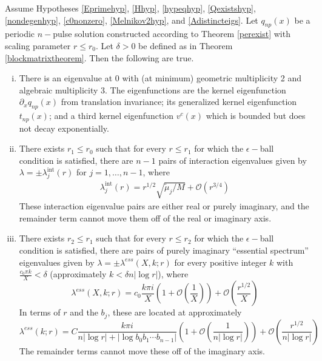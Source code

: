 \documentclass[thesis.tex]{subfiles}
\begin{document}

\begin{theorem}\label{locateeigtheorem}
Assume Hypotheses \ref{Eprimehyp}, \ref{Hhyp}, \ref{hypeqhyp}, \ref{Qexistshyp}, \ref{nondegenhyp}, \ref{c0nonzero}, \ref{Melnikov2hyp}, and \ref{Adistincteigs}. Let $q_{np}(x)$ be a periodic $n-$pulse solution constructed according to Theorem \ref{perexist} with scaling parameter $r \leq r_0$. Let $\delta > 0$ be defined as in Theorem \ref{blockmatrixtheorem}. Then the following are true.

\begin{enumerate}[(i)]

\item There is an eigenvalue at 0 with (at minimum) geometric multiplicity 2 and algebraic multiplicity 3. The eigenfunctions are the kernel eigenfunction $\partial_x q_{np}(x)$ from translation invariance; its generalized kernel eigenfunction $t_{np}(x)$; and a third kernel eigenfunction $v^c(x)$ which is bounded but does not decay exponentially.

\item There exists $r_1 \leq r_0$ such that for every $r \leq r_1$ for which the $\epsilon-$ball condition is satisfied, there are $n - 1$ pairs of interaction eigenvalues given by $\lambda = \pm \lambda^{\text{int}}_j(r)$ for $j = 1, \dots, n-1$, where
\begin{align*}
\lambda^{\text{int}}_j(r) = r^{1/2} \sqrt{\tilde{\mu}_j / M} + \mathcal{O}(r^{3/4})
\end{align*}
These interaction eigenvalue pairs are either real or purely imaginary, and the remainder term cannot move them off of the real or imaginary axis.

\item There exists $r_2 \leq r_1$ such that for every $r \leq r_2$ for which the $\epsilon-$ball condition is satisfied, there are pairs of purely imaginary ``essential spectrum'' eigenvalues given by $\lambda = \pm \lambda^{ess}(X,k; r)$ for every positive integer $k$ with $\frac{c_0 \pi k}{X} < \delta$ (approximately $k < \delta n |\log r|$), where
\begin{equation}\label{lambdaess}
\lambda^{ess}(X, k; r) = c_0 \frac{k \pi i }{X} \left( 1 + \mathcal{O}\left( \frac{1}{X} \right)\right) + \mathcal{O}\left( \frac{r^{1/2}}{X} \right)
\end{equation}
In terms of $r$ and the $b_j$, these are located at approximately
\begin{equation}\label{lambdaessr}
\lambda^{ess}(k; r) = C \frac{k \pi i }{n |\log r| + |\log b_0 b_1 \cdots b_{n-1}|}  \left( 1 + \mathcal{O}\left( \frac{1}{n |\log r|} \right)\right) + \mathcal{O}\left( \frac{r^{1/2}}{n |\log r|} \right)
\end{equation}
The remainder terms cannot move these off of the imaginary axis.


\end{enumerate}
\end{theorem}
\end{document}
